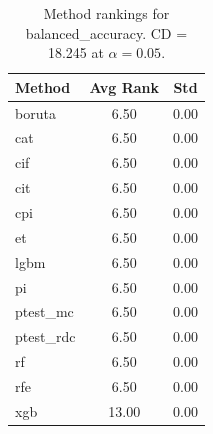 \begin{table}[h]
\centering
\caption{Method rankings for balanced_accuracy. CD = 18.245 at $\alpha=0.05$.}
\label{tab:ranks_balanced_accuracy}
\begin{tabular}{lcc}
\toprule
Method & Avg Rank & Std \\
\midrule
boruta & 6.50 & 0.00 \\
cat & 6.50 & 0.00 \\
cif & 6.50 & 0.00 \\
cit & 6.50 & 0.00 \\
cpi & 6.50 & 0.00 \\
et & 6.50 & 0.00 \\
lgbm & 6.50 & 0.00 \\
pi & 6.50 & 0.00 \\
ptest_mc & 6.50 & 0.00 \\
ptest_rdc & 6.50 & 0.00 \\
rf & 6.50 & 0.00 \\
rfe & 6.50 & 0.00 \\
xgb & 13.00 & 0.00 \\
\bottomrule
\end{tabular}
\end{table}